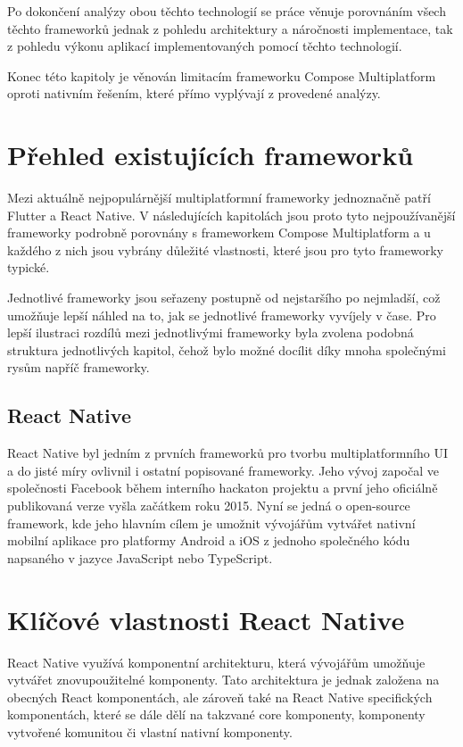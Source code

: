 Po dokončení analýzy obou těchto technologií se práce věnuje porovnáním všech těchto frameworků jednak z pohledu architektury
a náročnosti implementace, tak z pohledu výkonu aplikací implementovaných pomocí těchto technologií. 

Konec této kapitoly je věnován limitacím frameworku Compose Multiplatform oproti nativním řešením, které přímo vyplývají 
z provedené analýzy.  


\section{Přehled existujících frameworků}
Mezi aktuálně nejpopulárnější multiplatformní frameworky jednoznačně patří Flutter a React Native. \cite{crossPlatformFrameworksStats}
V následujících kapitolách jsou proto tyto nejpoužívanější frameworky podrobně porovnány s frameworkem Compose Multiplatform a u každého z nich 
jsou vybrány důležité vlastnosti, které jsou pro tyto frameworky typické. 

Jednotlivé frameworky jsou seřazeny postupně od nejstaršího
po nejmladší, což umožňuje lepší náhled na to, jak se jednotlivé frameworky vyvíjely v čase. Pro lepší ilustraci rozdílů 
mezi jednotlivými frameworky byla zvolena 
podobná struktura jednotlivých kapitol, čehož bylo možné docílit díky mnoha společnými rysům napříč frameworky.

\subsection{React Native}
React Native byl jedním z prvních frameworků pro tvorbu multiplatformního UI a do jisté míry ovlivnil i ostatní popisované
frameworky. Jeho vývoj započal ve společnosti Facebook během interního hackaton projektu a první jeho oficiálně publikovaná
verze vyšla začátkem roku 2015. \cite{reactNativeHistory}
Nyní se jedná o open-source framework, kde jeho hlavním cílem je umožnit vývojářům vytvářet nativní mobilní aplikace 
pro platformy Android a iOS z jednoho společného kódu napsaného v jazyce JavaScript nebo TypeScript.

\section*{Klíčové vlastnosti React Native}

React Native využívá komponentní architekturu, která vývojářům umožňuje 
vytvářet znovupoužitelné komponenty. \cite{reactNativeComponents} Tato architektura je jednak založena na obecných
React komponentách, ale zároveň také na React Native specifických komponentách, které se dále dělí na takzvané core
komponenty, komponenty vytvořené komunitou či vlastní nativní komponenty. \cite{reactNativeComponents}

